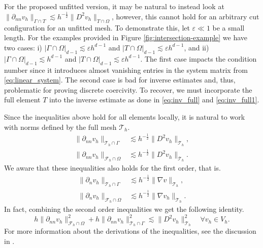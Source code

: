 \documentclass[11pt]{article}
\theoremstyle{remark}
\newcommand{\abs}[1]{\left\lvert #1 \right\rvert}
\numberwithin{equation}{section}
\begin{document}
For the proposed unfitted version, it may be natural to instead look at $\| \partial _{nn} v_{h} \|_{ \Gamma \cap T  }^{  } \lesssim h^{-\frac{1}{2}} \| D^2 v_{h} \|_{ T\cap \Omega  }^{  }$, however, this cannot hold for an arbitrary cut
configuration for an unfitted mesh. To demonstrate this, let $\varepsilon \ll 1$ be a small length. For the examples provided in
    Figure \ref{fig:intersection-example} we have two cases: i) $\abs{ \Gamma \cap \Omega  }_{d-1} \lesssim \varepsilon h^{d-1}  $ and $\abs{ T \cap \Omega  }_{d-1} \lesssim \varepsilon h^{d-1}  $, and ii)
    $\abs{ \Gamma \cap \Omega  }_{d-1} \lesssim  h^{d-1}  $ and $\abs{ T \cap \Omega  }_{d-1} \lesssim \varepsilon h^{d-1}  $.
    The first case impacts the condition number since it introduces almost vanishing entries in the system matrix from \eqref{eq:linear_system}.
    The second case is bad for inverse estimates and, thus, problematic for proving discrete coercivity. To recover, we must incorporate the full element $T$ into the inverse estimate as done in \eqref{eq:inv_full} and \eqref{eq:inv_full1}.


Since the inequalities above hold for all elements locally, it is natural to work with norms defined by the full mesh  $\mathcal{T}_{h} $.
\begin{align}
\label{eq:bi_cut_inverse_1}
\| \partial _{nn} v_h \|_{ \mathcal{T} _{h} \cap \Gamma  }^{  } &\lesssim h^{-\frac{1}{2}} \| D^2 v_h \|_{ \mathcal{T}_h }^{  }, \\
\label{eq:bi_cut_inverse_2}
\| \partial _{nn}  v_h \|_{ \mathcal{F}_h \cap \Omega    }^{  }  &  \lesssim   h^{-\frac{1}{2}} \| D^2 v_h \|_{ \mathcal{T}_h  }^{  }.
\end{align}
    We aware that these inequalities also holds for the first order, that is.
\begin{align}
\label{eq:bi_n_cut_inverse_1}
\| \partial _{n} v_h \|_{ \mathcal{T} _{h} \cap \Gamma  }^{  } &\lesssim h^{-\frac{1}{2}} \| \nabla v \|_{ \mathcal{T}_h }^{  }, \\
\label{eq:bi_n_cut_inverse_2}
\| \partial _{n}  v_h \|_{ \mathcal{F}_h \cap \Omega    }^{  }  &  \lesssim   h^{-\frac{1}{2}} \| \nabla v_h \|_{ \mathcal{T}_h  }^{  }.
\end{align}
In fact, combining the second order inequalities we get the following identity.
\begin{equation}
\label{eq:bi_identity}
h\| \partial _{nn}  v_{h} \|_{ \mathcal{F}_h \cap \Omega    }^{2 } + h\| \partial _{nn} v_{h} \|_{ \mathcal{T} _{h} \cap \Gamma  }^{2  } \lesssim \| D^2 v_{h} \|_{ \mathcal{T} _{h}  }^{2  } \quad  \forall v_{h} \in V_{h}.
\end{equation}
For more information about the derivations of the inequalities, see the discussion in \cite[Section 2.4]{gurkan2019stabilized}.
\end{document}
